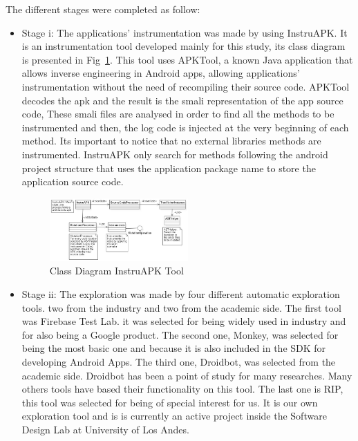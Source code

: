 The different stages were completed as follow:
\begin{itemize}
	\item Stage i: The applications' instrumentation was made by using InstruAPK. It is an instrumentation tool developed mainly for this study, its class diagram is presented in Fig~\ref{fig:classDiagramInstruAPK}. This tool uses APKTool, a known Java application that allows inverse engineering in Android apps, allowing applications' instrumentation without the need of recompiling their source code. APKTool decodes the apk and the result is the smali representation of the app source code, These smali files are analysed in order to find all the methods to be instrumented and then, the log code is injected at the very beginning of each method. Its important to notice that no external libraries methods are instrumented. InstruAPK only search for methods following the android project structure that uses the application package name to store the application source code.
	
\begin{figure}
	\centering
	\includegraphics[width=0.5\textwidth]{img/ClassDiagramInstruAPK.jpg}
	\vspace{-0.5cm}
	\caption{Class Diagram InstruAPK Tool}
	\label{fig:classDiagramInstruAPK}
\end{figure}

	\item Stage ii: The exploration was made by four different automatic exploration tools. two from the industry and two from the academic side. The first tool was Firebase Test Lab. it was selected for being widely used in industry and for also being a Google product. The second one, Monkey, was selected for being the most basic one and because it is also included in the SDK for developing Android Apps. The third one, Droidbot, was selected from the academic side. Droidbot has been a point of study for many researches. Many others tools have based their functionality on this tool. The last one is RIP, this tool was selected for being of special interest for us. It is our own exploration tool and is is currently an active project inside the Software Design Lab at University of Los Andes.
	

\end{itemize}
